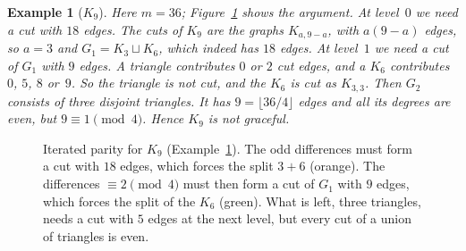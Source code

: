 \documentclass[11pt]{amsart}
\theoremstyle{tplain}
\theoremstyle{tdefinition}
\newtheorem{example}[theorem]{Example}
\theoremstyle{tremark}
\begin{document}
\begin{example}[$K_9$]\label{ex:k9}
Here $m=36$; Figure~\ref{fig:tower} shows the argument. At level~$0$ we need a cut with $18$ edges. The cuts of $K_9$
are the graphs $K_{a,9-a}$, with $a(9-a)$ edges, so $a=3$ and
$G_1=K_3\sqcup K_6$, which indeed has $18$ edges. At level~$1$ we need a cut of
$G_1$ with $9$ edges. A triangle contributes $0$ or $2$ cut edges, and a $K_6$
contributes $0$, $5$, $8$ or~$9$. So the triangle is not cut, and the $K_6$ is
cut as $K_{3,3}$. Then $G_2$ consists of three disjoint triangles. It has
$9=\lfloor36/4\rfloor$ edges and all its degrees are even, but
$9\equiv1\pmod4$. Hence $K_9$ is not graceful.
\end{example}

\begin{figure}[ht]
\centering
{}
\caption{Iterated parity for $K_9$ (Example~\ref{ex:k9}). The odd differences
must form a cut with $18$ edges, which forces the split $3+6$ (orange). The
differences $\equiv2\pmod4$ must then form a cut of $G_1$ with $9$ edges, which
forces the split of the $K_6$ (green). What is left, three triangles, needs a
cut with $5$ edges at the next level, but every cut of a union of triangles is
even.}
\label{fig:tower}
\end{figure}
\end{document}
